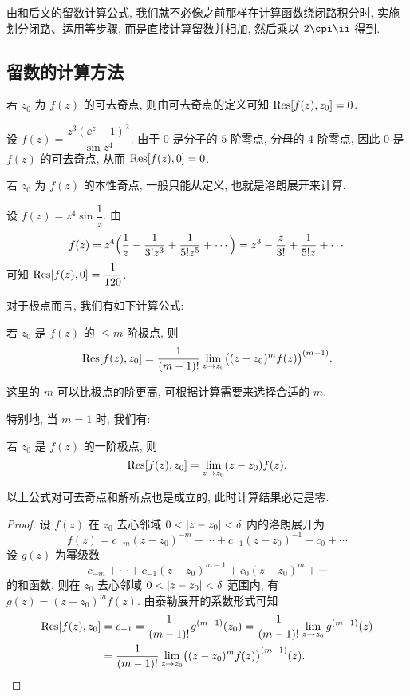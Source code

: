 由\thmRes 和后文的留数计算公式, 我们就不必像之前那样在计算函数绕闭路积分时, 实施划分闭路、运用\thmCI 等步骤, 而是直接\alert{计算留数并相加, 然后乘以 $2\cpi\ii$} 得到.


\subsection{留数的计算方法}

若 $z_0$ 为 $f(z)$ 的可去奇点, 则由可去奇点的定义可知 ${\mathrm{Res}}[f(z),z_0]=0$.

\begin{example}
  设 $f(z)=\dfrac{z^3(\ee^z-1)^2}{\sin z^4}$.
  \smallskip
  由于 $0$ 是分子的 $5$ 阶零点, 分母的 $4$ 阶零点, 因此 $0$ 是 $f(z)$ 的可去奇点, 从而 ${\mathrm{Res}}[f(z),0]=0$.
\end{example}

若 $z_0$ 为 $f(z)$ 的本性奇点, 一般只能从定义, 也就是洛朗展开来计算.

\begin{example}
  设 $f(z)=z^4\sin\dfrac1z$.
  由
  \[
     f(z)
    =z^4\Bigl(\frac1z-\frac1{3!z^3}+\frac1{5!z^5}+\cdots\Bigr)
    =z^3-\frac z{3!}+\frac1{5!z}+\cdots
  \]
  可知 ${\mathrm{Res}}[f(z),0]=\dfrac1{120}$.
\end{example}

对于极点而言, 我们有如下计算公式:

\begin{theorem}[留数计算公式 I]
  \label{thm:residue-formula-for-pole}
  若 $z_0$ 是 $f(z)$ 的 $\le m$ 阶极点, 则
  \[
    {\mathrm{Res}}[f(z),z_0]=\frac1{(m-1)!}\lim_{z\rightarrow z_0}\bigl((z-z_0)^mf(z)\bigr)^{(m-1)}.
  \]
\end{theorem}

这里的 $m$ 可以比极点的阶更高, 可根据计算需要来选择合适的 $m$.

特别地, 当 $m=1$ 时, 我们有:
\begin{theorem}[留数计算公式 II]
  若 $z_0$ 是 $f(z)$ 的一阶极点, 则
  \[
    {\mathrm{Res}}[f(z),z_0]=\lim_{z\rightarrow z_0}(z-z_0)f(z).
  \]
\end{theorem}
以上公式对可去奇点和解析点也是成立的, 此时计算结果必定是零.

\begin{proof}
  设 $f(z)$ 在 $z_0$ 去心邻域 $0<\left|z-z_0\right|<\delta$ 内的洛朗展开为
  \[
    f(z)=c_{-m}(z-z_0)^{-m}+\cdots+c_{-1}(z-z_0)^{-1}+c_0+\cdots
  \]
  设 $g(z)$ 为幂级数
  \[
    c_{-m}+\cdots+c_{-1}(z-z_0)^{m-1}+c_0(z-z_0)^m+\cdots
  \]
  的和函数, 则在 $z_0$ 去心邻域 $0<\left|z-z_0\right|<\delta$ 范围内, 有 $g(z)=(z-z_0)^mf(z)$.
  由泰勒展开的系数形式可知
  \begin{align*}
     {\mathrm{Res}}[f(z),z_0]&
    =c_{-1}
    =\frac1{(m-1)!}g^{(m-1)}(z_0)
    =\frac1{(m-1)!}\lim_{z\rightarrow z_0}g^{(m-1)}(z)\\&
    =\frac1{(m-1)!}\lim_{z\rightarrow z_0}\bigl((z-z_0)^mf(z)\bigr)^{(m-1)}(z).\qedhere
  \end{align*}
\end{proof}

